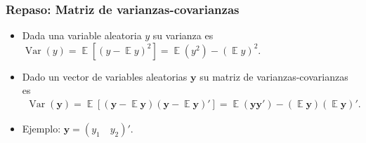 \documentclass[t, compress, spanish, aspectratio=169]{beamer}
\DeclareMathOperator{\Var}{Var}
\DeclareMathOperator{\E}{\mathbb{E}}
\begin{document}
	\begin{frame}
		\frametitle{Repaso: Matriz de varianzas-covarianzas}
		\begin{itemize}
			\item Dada una variable aleatoria $y$ su varianza es $\Var(y)=\E[(y-\E y)^2]=\E(y^2)-(\E y)^2$.
			\item Dado un vector de variables aleatorias $\mathbf{y}$ su matriz de varianzas-covarianzas es 
			\begin{align*}
			  \Var(\mathbf{y})=\E[(\mathbf{y}-\E \mathbf{y})(\mathbf{y}-\E \mathbf{y})']=\E(\mathbf{y}\mathbf{y}')-(\E \mathbf{y})(\E \mathbf{y})'.
			\end{align*}
			\item Ejemplo: $\mathbf{y} = (y_1\quad  y_2)'$.	
		\end{itemize}
	\end{frame}
%	
%
	
\end{document}
